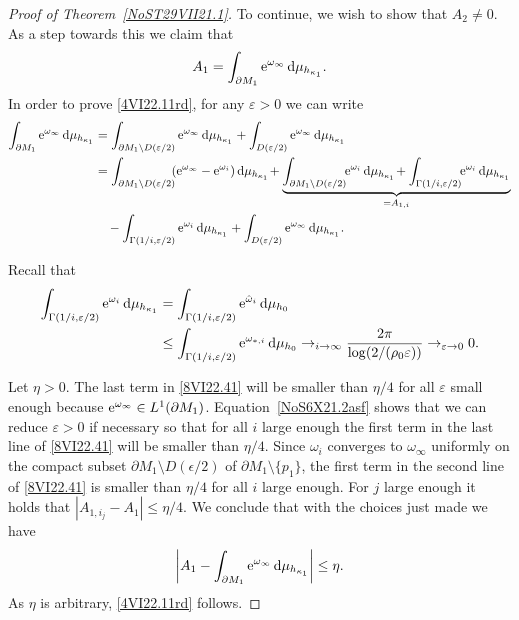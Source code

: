 \documentclass[pdftex]{sigma}
\numberwithin{equation}{section}
\newcommand{\hmv}{\red{\hat \omega}}
\newcommand{\repsilon}{ {\varepsilon}}
\newcommand{\red}[1]{{\color{red}#1}}
\newcommand{\mv}{\omega}%
\renewcommand{\red}[1]{#1}
\begin{document}
\begin{proof}[Proof of Theorem~\ref{NoST29VII21.1}]
To continue, we wish to show that $A_2\ne 0$. As a step towards this we claim that
\begin{equation}\label{4VI22.11rd}
 A_1 = \int_{\partial M_1} {\rm e}^{\mv_\infty}\, {\rm d}\mu_{h_{\kappa_1} }.
\end{equation}
In order to prove \eqref{4VI22.11rd}, for any $\repsilon>0$ we can write
\begin{align}
 \int_{\partial M_1} {\rm e}^{\mv_\infty}\, {\rm d}\mu_{h_{\kappa_1} }
 &=
 \int_{\partial M_1\setminus D(\repsilon/2)} {\rm e}^{\mv_\infty}\, {\rm d}\mu_{h_{\kappa_1} }
 +
 \int_{ D(\repsilon/2)} {\rm e}^{\mv_\infty} \,{\rm d}\mu_{h_{\kappa_1} }
 \nonumber
\\
 &=
 \int_{\partial M_1\setminus D(\repsilon/2)}\!\! ( {\rm e}^{\mv_\infty} - {\rm e}^{\mv_i} )\, {\rm d}\mu_{h_{\kappa_1} }\!
 +
 \underbrace{
 \int_{\partial M_1\setminus D(\repsilon/2)}\!\! {\rm e}^{\mv_i}\, {\rm d}\mu_{h_{\kappa_1} }\!
 +
 \int_{\Gamma(1/i,\repsilon/2) }\!\! {\rm e}^{\mv_i}\, {\rm d}\mu_{h_{\kappa_1}}
 }_{=A_{1,i}}
 \nonumber
\\
&\quad{}
 -
 \int_{\Gamma(1/i,\repsilon/2) } {\rm e}^{\mv_i}\, {\rm d}\mu_{h_{\kappa_1}}
 +
 \int_{ D(\repsilon/2)} {\rm e}^{\mv_\infty}\, {\rm d}\mu_{h_{\kappa_1} }. \label{8VI22.41}
\end{align}

Recall that
\begin{align}
 \int_{\Gamma(1/i,\repsilon/2) } {\rm e}^{\mv_i}\, {\rm d}\mu_{h_{\kappa_1}}
 & =
 \int_{\Gamma(1/i,\repsilon/2) } {\rm e}^{\hmv_i}\, {\rm d}\mu_{h_0}
\nonumber
\\
 &\le
 \int_{\Gamma(1/i,\repsilon/2) } {\rm e}^{\mv_{*,i} } \,{\rm d}\mu_{h_0}
 \to_{i\to\infty}
 \frac{2\pi }{\log (2/(\rho_0\repsilon))}
 \to_{\repsilon\to 0}
 0. \label{NoS6X21.2asf}
\end{align}

Let $\eta>0$. The last term in \eqref{8VI22.41} will be smaller than $\eta/4$ for all $\varepsilon$ small enough because ${\rm e}^{\omega_\infty}\in L^1(\partial M_1)$. Equation~\eqref{NoS6X21.2asf} shows that we can reduce $\varepsilon >0$ if necessary so that for all $i$ large enough the first term in the last line of \eqref{8VI22.41} will be smaller than $\eta/4$. Since $\omega_i $ converges to $\omega_\infty$ uniformly on the compact subset $\partial M_1\setminus D(\epsilon/2)$ of $\partial M_1\setminus \{p_1\}$, the first term in the second line of \eqref{8VI22.41} is smaller than $\eta/4$ for all $i$ large enough. For $j$ large enough it holds that $|A_{1,i_j} - A_1| \le \eta/4$.
We conclude that with the choices just made we have
\begin{equation*}%
 \left|A_1 - \int_{\partial M_1} {\rm e}^{\mv_\infty}\, {\rm d}\mu_{h_{\kappa_1} }\right| \le \eta.
\end{equation*}
As $\eta$ is arbitrary, \eqref{4VI22.11rd} follows.


\end{proof}
\end{document}
